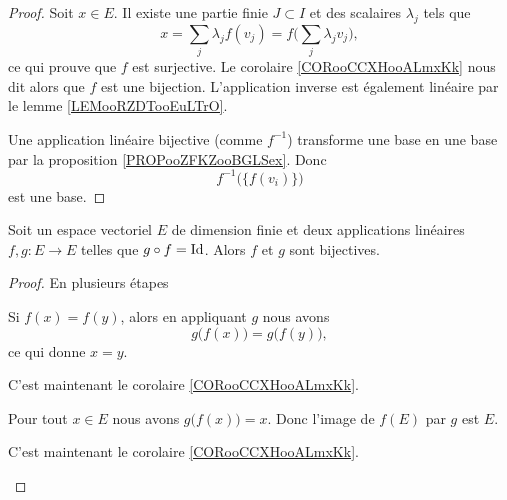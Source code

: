 \begin{proof}
    Soit \( x\in E\). Il existe une partie finie \( J\subset I\) et des scalaires \( \lambda_j\) tels que 
    \begin{equation}
        x=\sum_j\lambda_jf(v_j)=f\big( \sum_j\lambda_jv_j \big),
    \end{equation}
    ce qui prouve que \( f\) est surjective. Le corolaire \ref{CORooCCXHooALmxKk} nous dit alors que \( f\) est une bijection. L'application inverse est également linéaire par le lemme \ref{LEMooRZDTooEuLTrO}.

    Une application linéaire bijective (comme \( f^{-1}\)) transforme une base en une base par la proposition \ref{PROPooZFKZooBGLSex}. Donc 
    \begin{equation}
        f^{-1}\big( \{f(v_i)\} \big)
    \end{equation}
    est une base.
\end{proof}

\begin{proposition}     \label{PROPooADESooATJSrH}
    Soit un espace vectoriel \( E\) de dimension finie et deux applications linéaires \( f,g\colon E\to E\) telles que \( g\circ f=\operatorname{Id}\). Alors \( f\) et \( g\) sont bijectives.
\end{proposition}

\begin{proof}
    En plusieurs étapes
    \begin{subproof}
        \item[\( f\) est injective]
            Si \( f(x)=f(y)\), alors en appliquant \( g\) nous avons 
            \begin{equation}
                g\big( f(x) \big)=g\big( f(y) \big),
            \end{equation}
            ce qui donne \( x=y\).
        \item[\( f\) est surjective]
            C'est maintenant le corolaire \ref{CORooCCXHooALmxKk}.
        \item[\( g\) est surjective]
            Pour tout \( x\in E\) nous avons \( g\big( f(x) \big)=x\). Donc l'image de \( f(E)\) par \( g\) est $E$. 
        \item[\( g\) est injective]
            C'est maintenant le corolaire \ref{CORooCCXHooALmxKk}.
    \end{subproof}
\end{proof}

